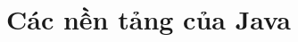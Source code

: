 \documentclass[11pt,fleqn]{book} %
\begin{document}




\part{Các nền tảng của Java}







\end{document}

